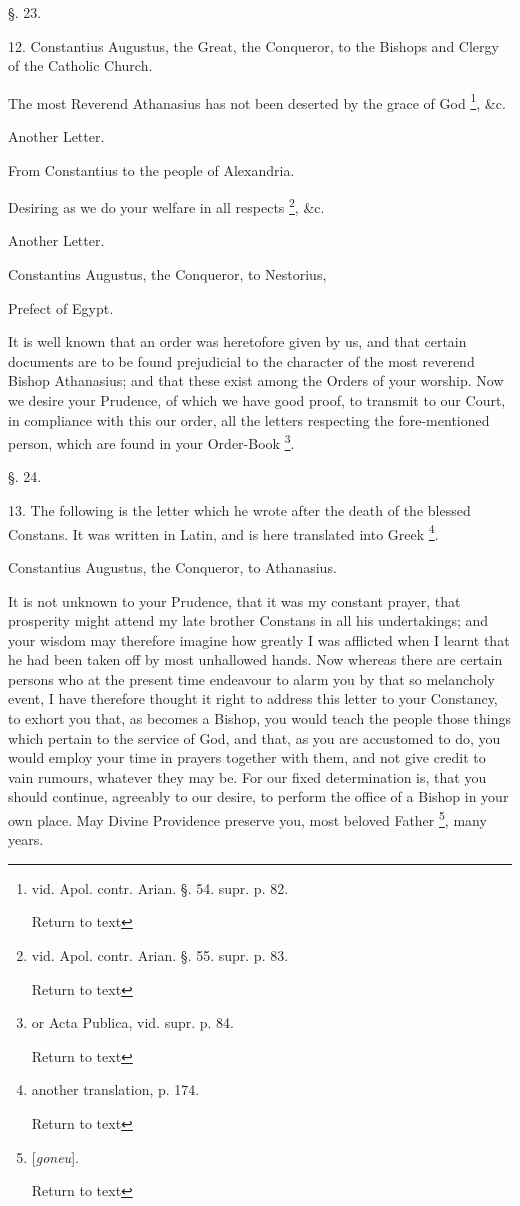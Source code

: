 §. 23.

12. Constantius Augustus, the Great, the
Conqueror, to the Bishops and Clergy of the Catholic Church.

The most Reverend Athanasius has not been
deserted by the grace of God \footnote{vid. Apol. contr. Arian. §. 54. supr. p. 82.

Return to text}, \&c.

Another
Letter.

From Constantius to the people
of Alexandria.

Desiring as we do your welfare in all respects \footnote{vid. Apol. contr. Arian. §. 55. supr. p. 83.

Return to text}, \&c.

Another Letter.

Constantius Augustus, the
Conqueror, to Nestorius,

Prefect of Egypt.

It is well known that an order was heretofore
given by us, and that certain documents are to be found prejudicial to
the character of the most reverend Bishop Athanasius; and that these
exist among the Orders  of your worship. Now we desire your
Prudence, of which we have good proof, to transmit to our Court, in
compliance with this our order, all the letters respecting the
fore-mentioned person, which are found in your Order-Book \footnote{or Acta Publica, vid. supr. p. 84.

Return to text}.

§. 24.

13. The following is the letter which he wrote
after the death of the blessed Constans. It was written in Latin, and
is here translated into Greek \footnote{another translation, p. 174.

Return to text}.

Constantius Augustus, the
Conqueror, to Athanasius.

It is not unknown to your Prudence, that it was
my constant prayer, that prosperity might attend my late brother
Constans in all his undertakings; and your wisdom may therefore
imagine how greatly I was afflicted when I learnt that he had been
taken off by most unhallowed hands. Now whereas there are certain
persons who at the present time endeavour to alarm you by that so
melancholy event, I have therefore thought it right to address this
letter to your Constancy, to exhort you that, as becomes a Bishop, you
would teach the people those things which pertain to the service of
God, and that, as you are accustomed to do, you would employ your time
in prayers together with them, and not give credit to vain rumours,
whatever they may be. For our fixed determination is, that you should
continue, agreeably to our desire, to perform the office of a Bishop
in your own place. May Divine Providence preserve you, most beloved
Father \footnote{[\emph{goneu}].

Return to text}, many years.

